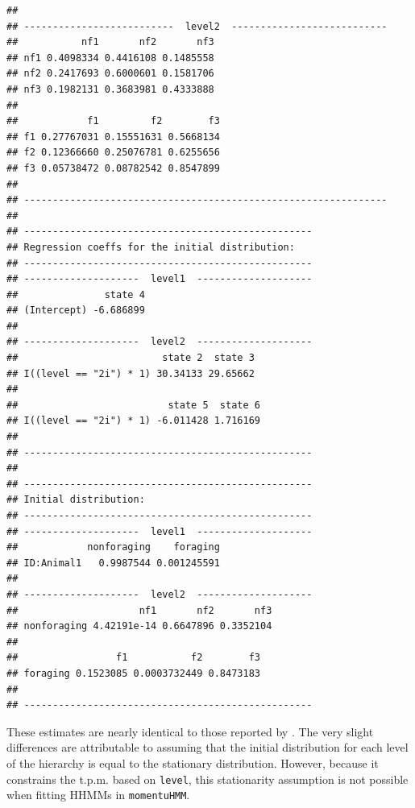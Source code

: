\documentclass[12pt]{article}\usepackage[]{graphicx}\usepackage[]{xcolor}
\makeatletter
\newenvironment{kframe}{%
 \def\at@end@of@kframe{}%
 \ifinner\ifhmode%
  \def\at@end@of@kframe{\end{minipage}}%
  \begin{minipage}{\columnwidth}%
 \fi\fi%
 \def\FrameCommand##1{\hskip\@totalleftmargin \hskip-\fboxsep
 \colorbox{shadecolor}{##1}\hskip-\fboxsep
     \hskip-\linewidth \hskip-\@totalleftmargin \hskip\columnwidth}%
 \MakeFramed {\advance\hsize-\width
   \@totalleftmargin\z@ \linewidth\hsize
   \@setminipage}}%
 {\par\unskip\endMakeFramed%
 \at@end@of@kframe}
\newenvironment{knitrout}{}{} %
\makeatother
\begin{document}
\begin{knitrout}
\begin{kframe}
\begin{verbatim}
## 
## --------------------------  level2  ---------------------------
##           nf1       nf2       nf3
## nf1 0.4098334 0.4416108 0.1485558
## nf2 0.2417693 0.6000601 0.1581706
## nf3 0.1982131 0.3683981 0.4333888
## 
##            f1         f2        f3
## f1 0.27767031 0.15551631 0.5668134
## f2 0.12366660 0.25076781 0.6255656
## f3 0.05738472 0.08782542 0.8547899
## 
## ---------------------------------------------------------------
## 
## --------------------------------------------------
## Regression coeffs for the initial distribution:
## --------------------------------------------------
## --------------------  level1  --------------------
##               state 4
## (Intercept) -6.686899
## 
## --------------------  level2  --------------------
##                         state 2  state 3
## I((level == "2i") * 1) 30.34133 29.65662
## 
##                          state 5  state 6
## I((level == "2i") * 1) -6.011428 1.716169
## 
## --------------------------------------------------
## 
## --------------------------------------------------
## Initial distribution:
## --------------------------------------------------
## --------------------  level1  --------------------
##            nonforaging    foraging
## ID:Animal1   0.9987544 0.001245591
## 
## --------------------  level2  --------------------
##                     nf1       nf2       nf3
## nonforaging 4.42191e-14 0.6647896 0.3352104
## 
##                 f1           f2        f3
## foraging 0.1523085 0.0003732449 0.8473183
## 
## --------------------------------------------------
\end{verbatim}
\end{kframe}
\end{knitrout}
\noindent These estimates are nearly identical to those reported by \cite{Leos-BarajasEtAl2017}.  The very slight differences are attributable to \cite{Leos-BarajasEtAl2017} assuming that the initial distribution for each level of the hierarchy is equal to the stationary distribution. However, because it constrains the t.p.m. based on \verb|level|, this stationarity assumption is not possible when fitting HHMMs in \verb|momentuHMM|.  
\end{document}
